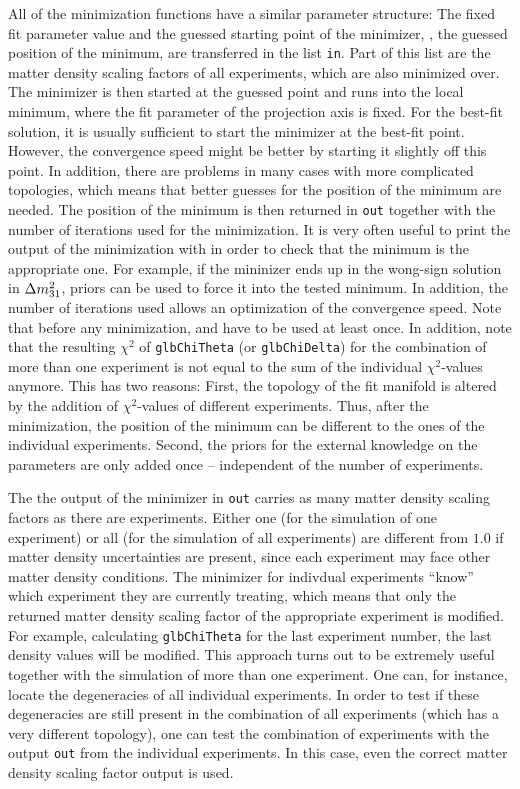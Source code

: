 All of the minimization functions have a similar parameter structure: The fixed fit parameter value and the guessed starting point of the minimizer, \ie, the guessed position of the minimum, are transferred in the list {\tt in}. Part of this list are the matter density
scaling factors of all experiments, which are also minimized over. 
The minimizer is then started at the guessed point and runs into
the local minimum, where the fit parameter of the projection
axis is fixed. For the best-fit solution, it is usually sufficient to start the minimizer at the best-fit point. However, the convergence speed might
be better by starting it slightly off this point. In addition, there
are problems in many cases with more complicated topologies, which means
that better guesses for the position of the minimum are needed.
The position of the minimum is then returned in {\tt out}
together with the number of iterations used for the minimization.
It is very often useful to print the output of the minimization with
 in order to check that the minimum is the
appropriate one. For example, if the mininizer ends up in the wong-sign
solution in $\Delta m_{31}^2$, priors can be used to force it into the tested
minimum. In addition, the number of iterations used allows an optimization
of the convergence speed. 
% 
Note that before any minimization,  
and  have to be used at least once. In addition, note that the resulting $\chi^2$ of {\tt glbChiTheta} (or {\tt glbChiDelta}) for the combination of more than one experiment is not 
equal to the sum of the individual $\chi^2$-values anymore. This has two reasons: First, the topology of the fit manifold is altered by the addition of $\chi^2$-values of different experiments. Thus, after the minimization, the position of the minimum can be different to the ones of the individual experiments. Second, the priors for the external knowledge on the parameters are only added once -- independent of the number of experiments.

The the output of the minimizer in {\tt out} carries as many matter density scaling factors as there are experiments. Either
one (for the simulation of one experiment) or all (for the simulation of
all experiments) are different from $1.0$ if matter density uncertainties
are present, since each experiment may face other matter density conditions. The minimizer for indivdual experiments ``know'' which
experiment they are currently treating, which means that only the returned
matter density scaling factor of the appropriate experiment is modified.
For example, calculating {\tt glbChiTheta} for the last experiment
number, the last density values will be modified.
This approach turns out to be extremely useful together with the
simulation of more than one experiment. One can, for instance, locate the
degeneracies of all individual experiments. In order to test if
these degeneracies are still present in the combination of all experiments (which has a very different topology), one can test the combination of experiments with the output {\tt out} from the individual experiments. In this case, even the correct matter density scaling factor
output is used. 

